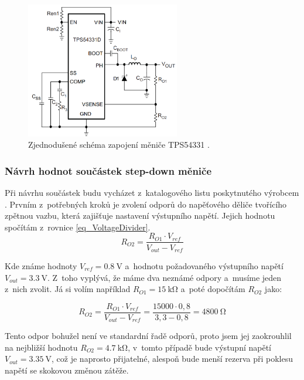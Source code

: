 \begin{figure}
    \centering
    \includegraphics[width=0.6\textwidth]{obrazky/schematicTPS54331.png}
    \caption[Zjednodušené schéma zapojení měniče TPS54331.]{Zjednodušené schéma zapojení měniče TPS54331 \cite{dat_TPS54331}.}
    \label{fig_Schematic-TPS54331}
\end{figure}

\subsubsection{Návrh hodnot součástek step-down měniče}

Při návrhu součástek budu vycházet z~katalogového listu poskytnutého výrobcem \cite{dat_TPS54331}. Prvním z~potřebných kroků je zvolení odporů do napěťového děliče tvořícího zpětnou vazbu, která zajišťuje nastavení výstupního napětí. Jejich hodnotu spočítám z~rovnice \ref{eq_VoltageDivider}.
\begin{equation}
    R_{O2}=\frac{R_{O1}\cdot V_{ref}}{V_{out}-V_{ref}}
    \label{eq_VoltageDivider}
\end{equation}

Kde známe hodnoty $V_{ref} = \SI{0,8}{\volt}$ a~hodnotu požadovaného výstupního napětí $V_{out} = \SI{3,3}{\volt}$. Z~toho vyplývá, že máme dva neznámé odpory a~musíme jeden z~nich zvolit. Já si volím například $R_{O1}=\SI{15}{\kilo\ohm}$ a~poté dopočítám $R_{O2}$ jako:

\begin{equation}
    R_{O2}=\frac{R_{O1}\cdot V_{ref}}{V_{out}-V_{ref}}=\frac{15000\cdot 0,8}{3,3-0,8}=\SI{4800}{\ohm}
    \label{eq_VoltageDivider-full}
\end{equation}

Tento odpor bohužel není ve standardní řadě odporů, proto jsem jej zaokrouhlil na nejbližší hodnotu $R_{O2}=\SI{4,7}{\kilo\ohm}$, v~tomto případě bude výstupní napětí $V_{out}=\SI{3,35}{\volt}$, což je naprosto přijatelné, alespoň bude menší rezerva při poklesu napětí se skokovou změnou zátěže.


